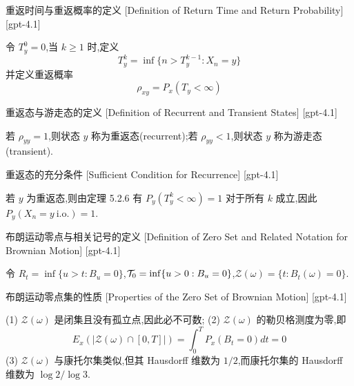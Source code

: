 \documentclass[UTF8]{ctexart}
\begin{document}
    
    
    \begin{dfn}
        {重返时间与重返概率的定义}
        [Definition of Return Time and Return Probability]
        [gpt-4.1]
        
令 $T_{y}^{0} = 0$,当 $k \geq 1$ 时,定义
\[
T_{y}^{k} = \operatorname*{inf} \{n > T_{y}^{k-1} : X_{n} = y\}
\]
并定义重返概率
\[
\rho_{xy} = P_{x}(T_{y} < \infty)
\]

    \end{dfn}
    
    
    
    \begin{dfn}
        {重返态与游走态的定义}
        [Definition of Recurrent and Transient States]
        [gpt-4.1]
        
若 $\rho_{yy} = 1$,则状态 $y$ 称为重返态(recurrent);若 $\rho_{yy} < 1$,则状态 $y$ 称为游走态(transient).

    \end{dfn}
    
    
    
    \begin{thm}
        {重返态的充分条件}
        [Sufficient Condition for Recurrence]
        [gpt-4.1]
        
若 $y$ 为重返态,则由定理 5.2.6 有 $P_{y}(T_{y}^{k} < \infty) = 1$ 对于所有 $k$ 成立,因此 $P_{y}(X_{n} = y\ \text{i.o.}) = 1$.

    \end{thm}
    
    
    
    \begin{dfn}
        {布朗运动零点与相关记号的定义}
        [Definition of Zero Set and Related Notation for Brownian Motion]
        [gpt-4.1]
        
令 $R_t = \operatorname{inf}\{ u > t : B_u = 0 \}$,${\cal T}_0 = \operatorname{inf}\{ u > 0 : B_u = 0 \}$,$\mathcal{Z}(\omega) = \{ t : B_t(\omega) = 0 \}$.

    \end{dfn}
    
    
    
    \begin{thm}
        {布朗运动零点集的性质}
        [Properties of the Zero Set of Brownian Motion]
        [gpt-4.1]
        
(1) $\mathcal{Z}(\omega)$ 是闭集且没有孤立点,因此必不可数;
(2) $\mathcal{Z}(\omega)$ 的勒贝格测度为零,即
\[
E_x(|\mathcal{Z}(\omega) \cap [0, T]|) = \int_0^T P_x(B_t = 0) dt = 0
\]
(3) $\mathcal{Z}(\omega)$ 与康托尔集类似,但其 Hausdorff 维数为 $1/2$,而康托尔集的 Hausdorff 维数为 $\log 2 / \log 3$.

    \end{thm}
    
\end{document}
